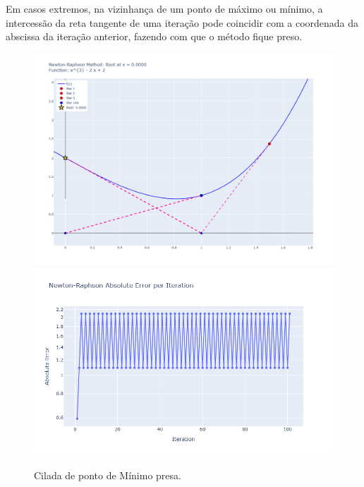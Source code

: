 Em casos extremos, na vizinhança de um ponto de máximo ou mínimo, a intercessão da reta tangente de uma iteração pode coincidir com a coordenada da abscissa da iteração anterior, fazendo com que o método fique preso.
\begin{figure}[H]
    \centering 
    \includegraphics[width=1\textwidth]{Imagens/pitfalls/03/x3_2x_2_10.png}
    \includegraphics[width=1\textwidth]{Imagens/pitfalls/03/err_x3_2x_2_10.png}
    \caption{Cilada de ponto de Mínimo presa.}
    \label{fig:ciladaMinMax_B}
\end{figure}

